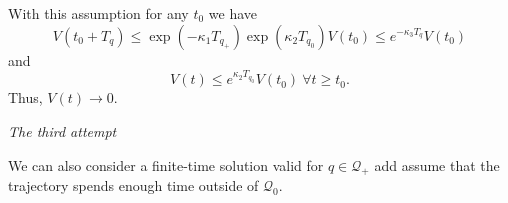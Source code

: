 With this assumption for any $t_0$ we have
\[
	V(t_0+T_q) \le \exp(-\kappa_1T_{q_+})\exp(\kappa_2T_{q_0})V(t_0) \le e^{-\kappa_3T_q}V(t_0)
\]
and 
\[
	V(t) \le e^{\kappa_2T_{q_0}}V(t_0) \ \forall t\ge t_0.
\]
Thus, $V(t) \to 0$.

\bigskip

\noindent\emph{The third attempt}

We can also consider a finite-time solution valid for $q\in\mathcal{Q}_+$ add assume that the trajectory spends enough time outside of $\mathcal{Q}_0$.



